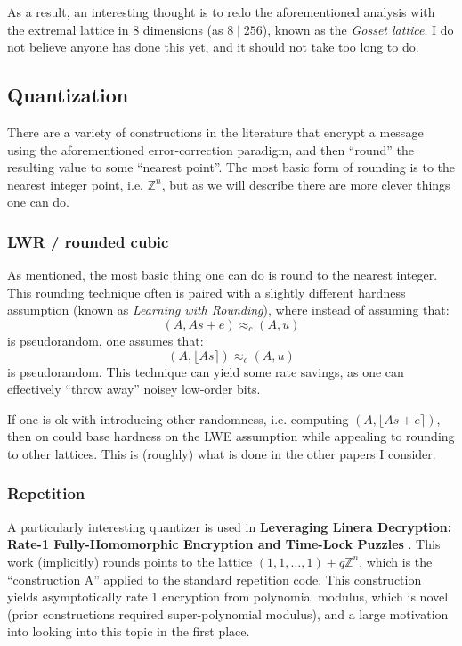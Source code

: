 \documentclass{article}
\begin{document}
As a result, an interesting thought is to redo the aforementioned analysis with the extremal lattice in 8 dimensions (as $8 \mid 256$), known as the \emph{Gosset lattice}.
I do not believe anyone has done this yet, and it should not take too long to do.

\subsection{Quantization}
There are a variety of constructions in the literature that encrypt a message using the aforementioned error-correction paradigm, and then ``round'' the resulting value to some ``nearest point''.
The most basic form of rounding is to the nearest integer point, i.e. $\mathbb{Z}^n$, but as we will describe there are more clever things one can do.


\subsubsection{LWR / rounded cubic}
As mentioned, the most basic thing one can do is round to the nearest integer.
This rounding technique often is paired with a slightly different hardness assumption (known as \emph{Learning with Rounding}), where instead of assuming that:
\begin{equation*}
(A, As + e)\approx_c (A, u)
\end{equation*}
is pseudorandom, one assumes that:
\begin{equation*}
(A, \lfloor As\rceil)\approx_c (A, u)
\end{equation*}
is pseudorandom.
This technique can yield some rate savings, as one can effectively ``throw away'' noisey low-order bits.

If one is ok with introducing other randomness, i.e. computing $(A, \lfloor As + e\rceil)$, then on could base hardness on the LWE assumption while appealing to rounding to other lattices.
This is (roughly) what is done in the other papers I consider.

\subsubsection{Repetition}
A particularly interesting quantizer is used in \textbf{Leveraging Linera Decryption: Rate-1 Fully-Homomorphic Encryption and Time-Lock Puzzles} \cite{brakerski_leveraging_2019}.
This work (implicitly) rounds points to the lattice $(1,1,\dots,1) + q\mathbb{Z}^n$, which is the ``construction A'' applied to the standard repetition code.
This construction yields asymptotically rate 1 encryption from polynomial modulus, which is novel (prior constructions required super-polynomial modulus), and a large motivation into looking into this topic in the first place.
\end{document}
